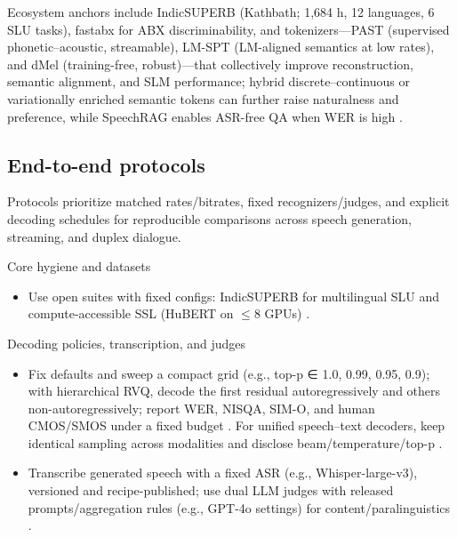 \documentclass{article}
\begin{document}
Ecosystem anchors include IndicSUPERB (Kathbath; 1,684 h, 12 languages, 6 SLU tasks), fastabx for ABX discriminability, and tokenizers---PAST (supervised phonetic--acoustic, streamable), LM-SPT (LM-aligned semantics at low rates), and dMel (training-free, robust)---that collectively improve reconstruction, semantic alignment, and SLM performance; hybrid discrete--continuous or variationally enriched semantic tokens can further raise naturalness and preference, while SpeechRAG enables ASR-free QA when WER is high \cite{entry2025indicsuperbspeechprocessinguniversalperf,poli2025fastabxlibraryefficientcomputationabxdis,har-tuv2025pastphoneticacousticspeechtokenizer,jo2025lmsptalignedsemanticdistillationspeechto,bai2025dmelspeechtokenizationmadesimple,verma2024whispergpthybridrepresentationaudiolarge,chen2025variationalframeworkimprovingnaturalness,min2025speechretrievalaugmentedgenerationwithou}.

\subsection{End-to-end protocols} \label{subsec:end-to-endprotocols}
Protocols prioritize matched rates/bitrates, fixed recognizers/judges, and explicit decoding schedules for reproducible comparisons across speech generation, streaming, and duplex dialogue.

Core hygiene and datasets
\begin{itemize}
  \item Use open suites with fixed configs: IndicSUPERB for multilingual SLU and compute-accessible SSL (HuBERT on $\leq$8 GPUs) \cite{entry2025indicsuperbspeechprocessinguniversalperf,chen2023reducingbarriersselfsupervisedlearninghu}.
\end{itemize}

Decoding policies, transcription, and judges
\begin{itemize}
  \item Fix defaults and sweep a compact grid (e.g., top-p ∈ {1.0, 0.99, 0.95, 0.9}); with hierarchical RVQ, decode the first residual autoregressively and others non-autoregressively; report WER, NISQA, SIM-O, and human CMOS/SMOS under a fixed budget \cite{li2024investigatingneuralaudiocodecsspeechlang}. For unified speech--text decoders, keep identical sampling across modalities and disclose beam/temperature/top-p \cite{huang2025dynamicsuperbphase2collaborativelyexpand}.
  \item Transcribe generated speech with a fixed ASR (e.g., Whisper-large-v3), versioned and recipe-published; use dual LLM judges with released prompts/aggregation rules (e.g., GPT-4o settings) for content/paralinguistics \cite{wang2025incorporatingcontextualparalinguisticund,wang2024blspemotowardsempatheticlargespeechlangu}.
\end{itemize}
\end{document}
